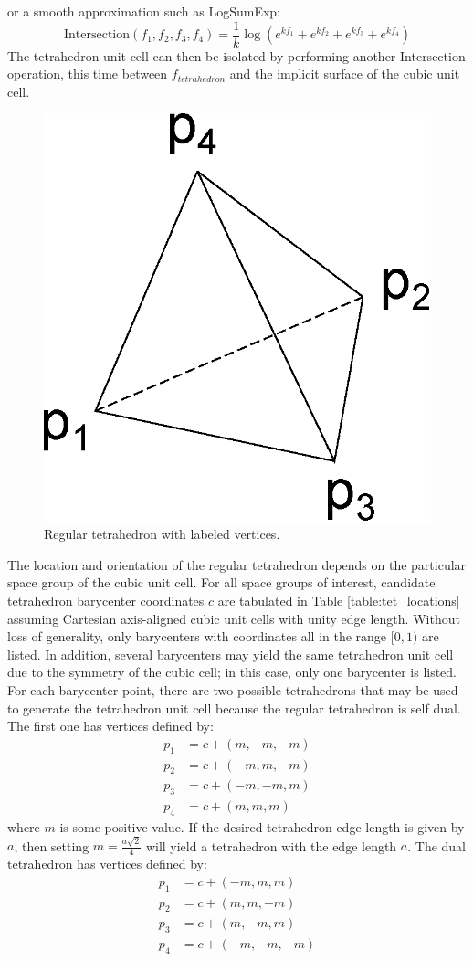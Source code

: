 \documentclass{article}
\begin{document}
or a smooth approximation such as LogSumExp:
\begin{equation}
    \text{Intersection}(f_1, f_2, f_3, f_4) = \frac{1}{k}\log\left(e^{kf_1} + e^{kf_2} + e^{kf_3} + e^{kf_4}\right)
\end{equation}
The tetrahedron unit cell can then be isolated by performing another Intersection operation, this time between $f_{tetrahedron}$ and the implicit surface of the cubic unit cell.
\begin{figure}
    \centering
    \includegraphics[width=0.25\linewidth]{figures/unit_tetrahedron.eps}
    \caption{Regular tetrahedron with labeled vertices.}
    \label{fig:unit_tetrahedron}
\end{figure}

The location and orientation of the regular tetrahedron depends on the particular space group of the cubic unit cell. For all space groups of interest, candidate tetrahedron barycenter coordinates $c$ are tabulated in Table \ref{table:tet_locations} assuming Cartesian axis-aligned cubic unit cells with unity edge length. Without loss of generality, only barycenters with coordinates all in the range $[0, 1)$ are listed. In addition, several barycenters may yield the same tetrahedron unit cell due to the symmetry of the cubic cell; in this case, only one barycenter is listed. For each barycenter point, there are two possible tetrahedrons that may be used to generate the tetrahedron unit cell because the regular tetrahedron is self dual. The first one has vertices defined by:
\begin{equation}
    \begin{split}
        p_1 & = c + (m, -m, -m) \\
        p_2 & = c + (-m, m, -m) \\
        p_3 & = c + (-m, -m, m) \\
        p_4 & = c + (m, m, m)
    \end{split}
\end{equation}
where $m$ is some positive value. If the desired tetrahedron edge length is given by $a$, then setting $m=\frac{a\sqrt{2}}{4}$ will yield a tetrahedron with the edge length $a$. The dual tetrahedron has vertices defined by:
\begin{equation}
    \begin{split}
        p_1 & = c + (-m, m, m) \\
        p_2 & = c + (m, m, -m) \\
        p_3 & = c + (m, -m, m) \\
        p_4 & = c + (-m, -m, -m)
    \end{split}
\end{equation}
\end{document}
